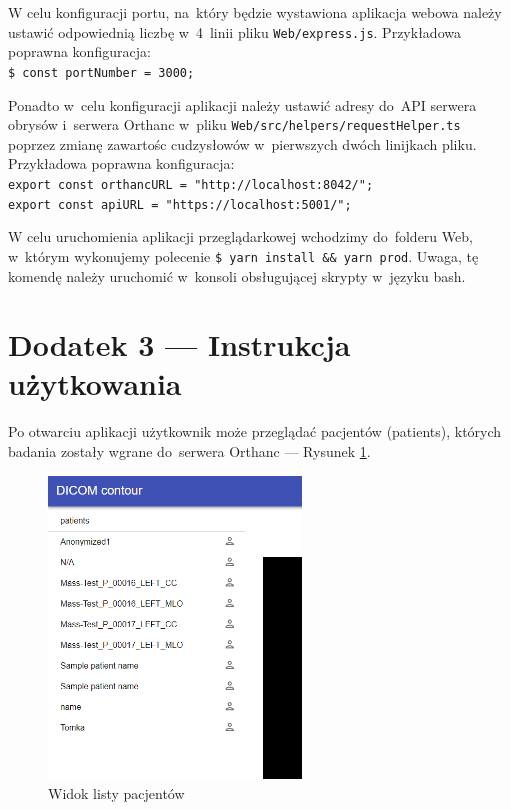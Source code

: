 \documentclass[a4paper,11pt,twoside,openright]{report}
\theoremstyle{definition}
\begin{document}
W celu konfiguracji portu, na~który będzie wystawiona aplikacja webowa należy
ustawić odpowiednią liczbę w~4~linii pliku \texttt{Web/express.js}. Przykładowa poprawna
konfiguracja:\\
\texttt{\$ const portNumber = 3000;}

Ponadto w~celu konfiguracji aplikacji należy ustawić adresy do~API serwera obrysów
i~serwera Orthanc w~pliku \texttt{Web/src/helpers/requestHelper.ts} poprzez zmianę zawartośc
cudzysłowów w~pierwszych dwóch linijkach pliku. 	Przykładowa poprawna konfiguracja:\\
\texttt{export const orthancURL = "http://localhost:8042/";}\\
\texttt{export const apiURL = "https://localhost:5001/";}

W celu uruchomienia aplikacji przeglądarkowej wchodzimy do~folderu Web, w~którym
wykonujemy polecenie \texttt{\$ yarn install \&\& yarn prod}. Uwaga, tę komendę
należy uruchomić w~konsoli obsługującej skrypty w~języku bash.




\newpage
\chapter*{Dodatek 3 --- Instrukcja użytkowania}

Po otwarciu aplikacji użytkownik może przeglądać pacjentów (patients), których
badania zostały wgrane do~serwera Orthanc --- Rysunek \ref{fig:1}.

\begin{figure}[h!]
	\center
	\includegraphics[width=0.6\textwidth]{1}
	\caption{Widok listy pacjentów}
    	\label{fig:1}
\end{figure}
\end{document}
